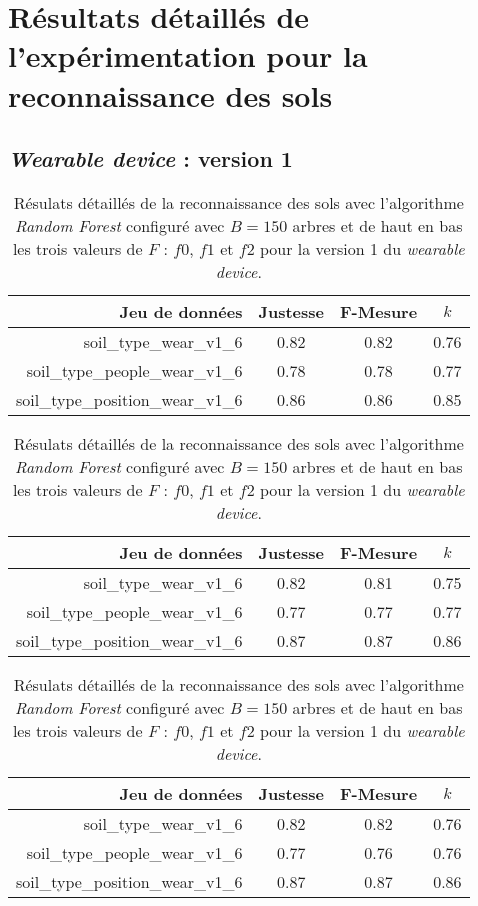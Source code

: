 \chapter{Résultats détaillés de l'expérimentation pour la reconnaissance des sols}

\section{\textit{Wearable device} : version 1}

\begin{table}[H]\renewcommand{\arraystretch}{0.5}
	\centering
	\caption{Résulats détaillés de la reconnaissance des sols avec l'algorithme \textit{Random Forest} configuré avec $B=150$ arbres et de haut en bas les trois valeurs de $F$ : $f0$, $f1$ et $f2$ pour la version 1 du \textit{wearable device}.}
	\label{tab:rf-150-wear-v1}
	\begin{tabular}{@{}rccc@{}}
		\toprule
			\textbf{Jeu de données} & \textbf{Justesse} & \textbf{F-Mesure} & \textbf{$k$} \\
		\midrule
			soil\_type\_wear\_v1\_6 & 0.82 & 0.82 & 0.76 \\
			soil\_type\_people\_wear\_v1\_6 & 0.78 & 0.78 & 0.77 \\
			soil\_type\_position\_wear\_v1\_6 & 0.86 & 0.86 & 0.85 \\
	\end{tabular}
	\begin{tabular}{@{}rccc@{}}
		\toprule
			\textbf{Jeu de données} & \textbf{Justesse} & \textbf{F-Mesure} & \textbf{$k$} \\
		\midrule
			soil\_type\_wear\_v1\_6 & 0.82 & 0.81 & 0.75 \\
			soil\_type\_people\_wear\_v1\_6 & 0.77 & 0.77 & 0.77 \\
			soil\_type\_position\_wear\_v1\_6 & 0.87 & 0.87 & 0.86 \\
	\end{tabular}
	\begin{tabular}{@{}rccc@{}}
		\toprule
			\textbf{Jeu de données} & \textbf{Justesse} & \textbf{F-Mesure} & \textbf{$k$} \\
		\midrule
			soil\_type\_wear\_v1\_6 & 0.82 & 0.82 & 0.76 \\
			soil\_type\_people\_wear\_v1\_6 & 0.77 & 0.76 & 0.76 \\
			soil\_type\_position\_wear\_v1\_6 & 0.87 & 0.87 & 0.86 \\
		\bottomrule
	\end{tabular}
\end{table}

